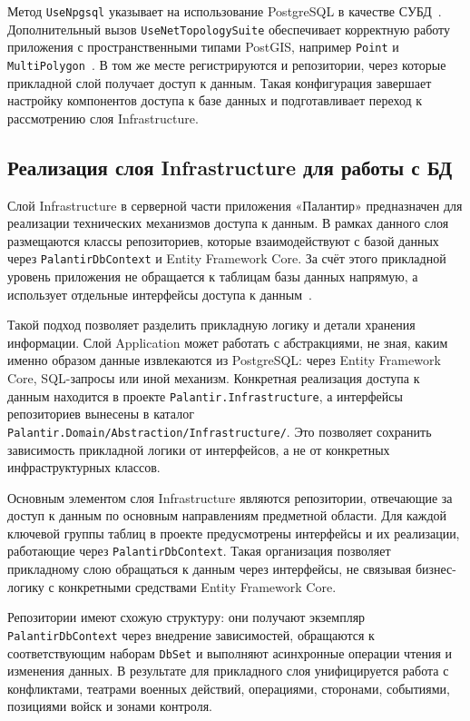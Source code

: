 Метод \texttt{UseNpgsql} указывает на использование PostgreSQL в качестве СУБД~\cite{npgsql_efcore_provider}. Дополнительный вызов \texttt{UseNetTopologySuite} обеспечивает корректную работу приложения с пространственными типами PostGIS, например \texttt{Point} и \texttt{MultiPolygon}~\cite{npgsql_postgis_nts}. 
В том же месте регистрируются и репозитории, через которые прикладной слой получает доступ к данным. Такая конфигурация завершает настройку компонентов доступа к базе данных и подготавливает переход к рассмотрению слоя Infrastructure.

\subsection{Реализация слоя Infrastructure для работы с БД}

Слой Infrastructure в серверной части приложения «Палантир» предназначен для реализации технических механизмов доступа к данным. В рамках данного слоя размещаются классы репозиториев, которые взаимодействуют с базой данных через \texttt{PalantirDbContext} и Entity Framework Core. За счёт этого прикладной уровень приложения не обращается к таблицам базы данных напрямую, а использует отдельные интерфейсы доступа к данным~\cite{lock_aspnet_core_in_action}.

Такой подход позволяет разделить прикладную логику и детали хранения информации. Слой Application может работать с абстракциями, не зная, каким именно образом данные извлекаются из PostgreSQL: через Entity Framework Core, SQL-запросы или иной механизм. Конкретная реализация доступа к данным находится в проекте \texttt{Palantir.Infrastructure}, а интерфейсы репозиториев вынесены в каталог \texttt{Palantir.Domain/Abstraction/Infrastructure/}. Это позволяет сохранить зависимость прикладной логики от интерфейсов, а не от конкретных инфраструктурных классов.

Основным элементом слоя Infrastructure являются репозитории, отвечающие за доступ к данным по основным направлениям предметной области. Для каждой ключевой группы таблиц в проекте предусмотрены интерфейсы и их реализации, работающие через \texttt{PalantirDbContext}. Такая организация позволяет прикладному слою обращаться к данным через интерфейсы, не связывая бизнес-логику с конкретными средствами Entity Framework Core.

Репозитории имеют схожую структуру: они получают экземпляр \texttt{PalantirDbContext} через внедрение зависимостей, обращаются к соответствующим наборам \texttt{DbSet} и выполняют асинхронные операции чтения и изменения данных. В результате для прикладного слоя унифицируется работа с конфликтами, театрами военных действий, операциями, сторонами, событиями, позициями войск и зонами контроля.

